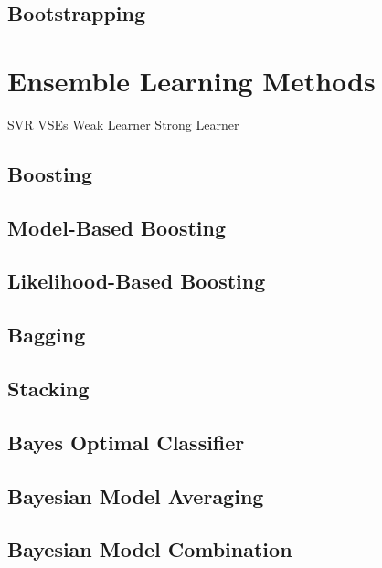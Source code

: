 \subsection{Bootstrapping}

\section{Ensemble Learning Methods}
SVR
VSEs
Weak Learner
Strong Learner
\subsection{Boosting}
\subsection{Model-Based Boosting}
\subsection{Likelihood-Based Boosting}
\subsection{Bagging}
\subsection{Stacking}
\subsection{Bayes Optimal Classifier}
\subsection{Bayesian Model Averaging}
\subsection{Bayesian Model Combination}
